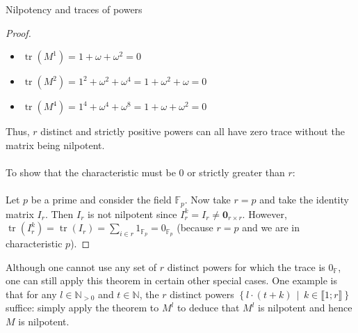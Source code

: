 \begin{appendixitem}{Nilpotency and traces of powers}
\begin{proof}
\begin{itemize}
            \item \( \operatorname{tr}\left(M^1\right) = 1 + \omega + \omega^2 = 0 \)
            \item \( \operatorname{tr}\left(M^2\right) = 1^2 + \omega^2 + \omega^4 = 1 + \omega^2 + \omega = 0 \)
            \item \( \operatorname{tr}\left(M^4\right) = 1^4 + \omega^4 + \omega^8 = 1 + \omega + \omega^2 = 0 \)
        \end{itemize}
        Thus, \( r \) distinct and strictly positive powers can all have zero trace without the matrix being nilpotent.
        \\\\
        To show that the characteristic must be \( 0 \) or strictly greater than \( r \):
        \\\\
        Let \( p \) be a prime and consider the field \( \mathbb{F}_p \). Now take \( r=p \) and take the identity matrix \( I_r \). Then \( I_r \) is not nilpotent since \( I_r^k = I_r \neq \mathbf{0}_{r \times r} \). However, \( \operatorname{tr}\left(I_r^k\right) = \operatorname{tr}\left(I_r\right) = \sum_{i\in r}1_{\mathbb{F}_p} = 0_{\mathbb{F}_p} \) (because \( r=p \) and we are in characteristic \( p \)).
    \end{proof}
    \begin{remark}
        Although one cannot use any set of \( r \) distinct powers for which the trace is \( 0_{\mathbb{F}} \), one can still apply this theorem in certain other special cases. One example is that for any \( l \in \mathbb{N}_{>0} \) and \( t\in\mathbb{N} \), the \( r \) distinct powers \( \left\{ l\cdot \left(t+k\right) \,\middle|\, k \in \llbracket 1;r \rrbracket \right\} \) suffice: simply apply the theorem to \( M^l \) to deduce that \( M^l \) is nilpotent and hence \( M \) is nilpotent.
    \end{remark}
\end{appendixitem}
